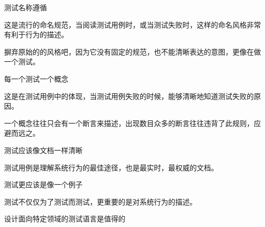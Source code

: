 \begin{content}

\begin{regulation}
测试名称遵循
\end{regulation}

这是流行的命名规范，当阅读测试用例时，或当测试失败时，这样的命名风格非常有利于行为的描述。

摒弃原始的的风格吧，因为它没有固定的规范，也不能清晰表达的意图，更像在做一个测试。

\begin{regulation}
每一个测试一个概念
\end{regulation}

这是在测试用例中的体现，当测试用例失败的时候，能够清晰地知道测试失败的原因。

一个概念往往只会有一个断言来描述，出现数目众多的断言往往违背了此规则，应避而远之。

\begin{regulation}
测试应该像文档一样清晰
\end{regulation}

测试用例是理解系统行为的最佳途径，也是最实时，最权威的文档。

\begin{regulation}
测试更应该是像一个例子
\end{regulation}

测试不仅仅为了测试而测试，更重要的是对系统行为的描述。

\begin{regulation}
设计面向特定领域的测试语言是值得的
\end{regulation}

\end{content}
